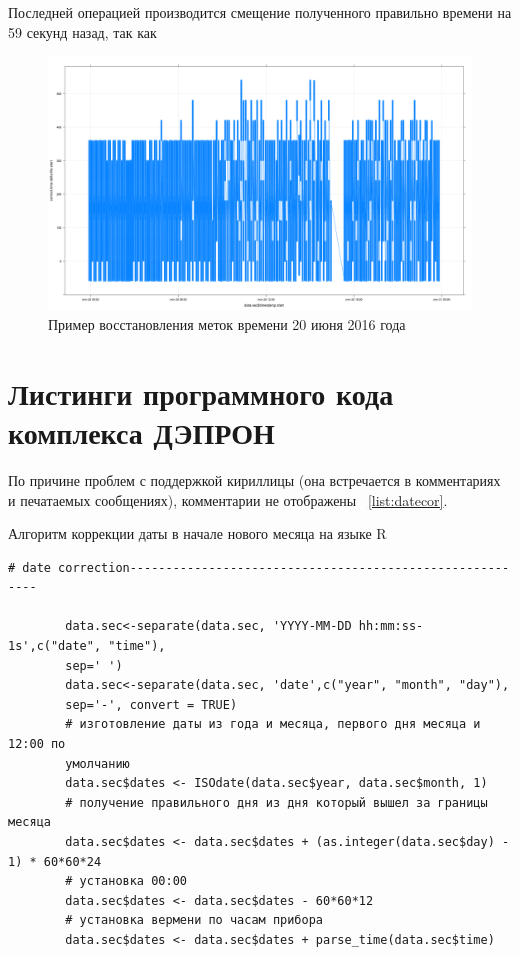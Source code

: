 \documentclass[a4paper,14pt]{extreport}
\begin{document}
	Последней операцией производится смещение полученного правильно времени на 59 
	секунд назад, так как 
	
	
	
	
	
	
	\begin{figure}
		\centering
		\includegraphics[width=0.9\linewidth]{images/depron_time_172}
		\caption{Пример восстановления меток времени 20 июня 2016 года}
		\label{fig:deprontime172}
	\end{figure}
	
	
	
	
	\section{Листинги программного кода комплекса ДЭПРОН} \label{AppendixB}
	
	
	По причине проблем с поддержкой кириллицы (она встречается в комментариях и
	печатаемых сообщениях), комментарии не отображены ~\ref{list:datecor}.
	
	\begin{ListingEnv}[H]
		\caption{Алгоритм коррекции даты в начале нового месяца на языке R}
		\label{list:datecor}
		\begin{lstlisting}[language={Renhanced}]
		# date correction---------------------------------------------------------
		
		data.sec<-separate(data.sec, 'YYYY-MM-DD hh:mm:ss-1s',c("date", "time"),
		sep=' ')
		data.sec<-separate(data.sec, 'date',c("year", "month", "day"),
		sep='-', convert = TRUE)
		# изготовление даты из года и месяца, первого дня месяца и 12:00 по 
		умолчанию
		data.sec$dates <- ISOdate(data.sec$year, data.sec$month, 1)
		# получение правильного дня из дня который вышел за границы месяца
		data.sec$dates <- data.sec$dates + (as.integer(data.sec$day) - 1) * 60*60*24
		# установка 00:00  
		data.sec$dates <- data.sec$dates - 60*60*12 
		# установка вермени по часам прибора
		data.sec$dates <- data.sec$dates + parse_time(data.sec$time)
		
		\end{lstlisting}
	\end{ListingEnv}
	
\end{document}
